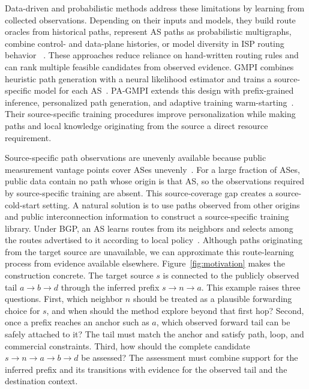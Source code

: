 \documentclass[conference]{IEEEtran}
\begin{document}
Data-driven and probabilistic methods address these limitations by
learning from collected observations. Depending on their inputs and
models, they build route oracles from historical paths, represent AS
paths as probabilistic multigraphs, combine control- and data-plane
histories, or model diversity in ISP routing behavior
~\cite{cunha2016sibyl,probinfer,singh2021predictroute,wang2022routeinfer}.
These approaches reduce reliance on hand-written routing rules and can
rank multiple feasible candidates from observed evidence. GMPI combines
heuristic path generation with a neural likelihood estimator and trains
a source-specific model for each AS~\cite{li2023realizing}. PA-GMPI
extends this design with prefix-grained inference, personalized path
generation, and adaptive training warm-starting~\cite{li2024realizing}.
Their source-specific training procedures improve personalization while
making paths and local knowledge originating from the source a direct
resource requirement.

Source-specific path observations are unevenly available because public
measurement vantage points cover ASes unevenly~\cite{RouteViews,RIPERIS}.
For a large fraction of ASes, public data contain no path whose origin is
that AS, so the observations required by source-specific training are
absent. This source-coverage gap creates a source-cold-start setting.
A natural solution is to use paths observed from other origins and public
interconnection information to construct a source-specific training
library. Under BGP, an AS learns routes from its neighbors and selects
among the routes advertised to it according to local policy~\cite{rfc4271}.
Although paths originating from the target source are unavailable, we can
approximate this route-learning process from evidence available elsewhere.
Figure~\ref{fig:motivation} makes the construction concrete. The target
source $s$ is connected to the publicly observed tail $a\rightarrow b
\rightarrow d$ through the inferred prefix $s\rightarrow n\rightarrow a$.
This example raises three questions. First, which neighbor $n$ should be
treated as a plausible forwarding choice for $s$, and when should the
method explore beyond that first hop? Second, once a prefix reaches an
anchor such as $a$, which observed forward tail can be safely attached to
it? The tail must match the anchor and satisfy path, loop, and commercial
constraints. Third, how should the complete candidate
$s\rightarrow n\rightarrow a\rightarrow b\rightarrow d$ be assessed?
The assessment must combine support for the inferred prefix and its
transitions with evidence for the observed tail and the destination
context.
\end{document}
